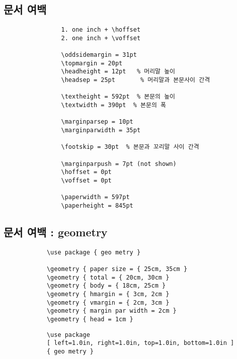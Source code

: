 	\newpage  
	\subsection*{문서 여백}

		\singlespacing
		\setlength{\fboxsep}{12pt}
		\begin{boxedminipage}[c]{1.0\linewidth}
			\begin{verbatim}
				1. one inch + \hoffset
				2. one inch + \voffset
				
				\oddsidemargin = 31pt
				\topmargin = 20pt
				\headheight = 12pt   % 머리말 높이
				\headsep = 25pt       % 머리말과 본문사이 간격
				
				\textheight = 592pt  % 본문의 높이
				\textwidth = 390pt	% 본문의 폭
				
				\marginparsep = 10pt
				\marginparwidth = 35pt
				
				\footskip = 30pt  % 본문과 꼬리말 사이 간격
				
				\marginparpush = 7pt (not shown)
				\hoffset = 0pt
				\voffset = 0pt
				
				\paperwidth = 597pt
				\paperheight = 845pt
			\end{verbatim} 
		\end{boxedminipage}
		\doublespacing


	\newpage  
	\subsection*{문서 여백 : geometry }

		\singlespacing
		\setlength{\fboxsep}{12pt}
		\begin{boxedminipage}[c]{1.0\linewidth}
			\begin{verbatim}
			\use package { geo metry }
			
			\geometry { paper size = { 25cm, 35cm }
			\geometry { total = { 20cm, 30cm }
			\geometry { body = { 18cm, 25cm }
			\geometry { hmargin = { 3cm, 2cm }
			\geometry { vmargin = { 2cm, 3cm }
			\geometry { margin par width = 2cm }
			\geometry { head = 1cm }
			\end{verbatim} 
		\end{boxedminipage}
		\doublespacing
	
		\singlespacing
		\setlength{\fboxsep}{12pt}
		\begin{boxedminipage}[c]{1.0\linewidth}
			\begin{verbatim}
			\use package 
			[ left=1.0in, right=1.0in, top=1.0in, bottom=1.0in ]
			{ geo metry }
			\end{verbatim} 
		\end{boxedminipage}
		\doublespacing












